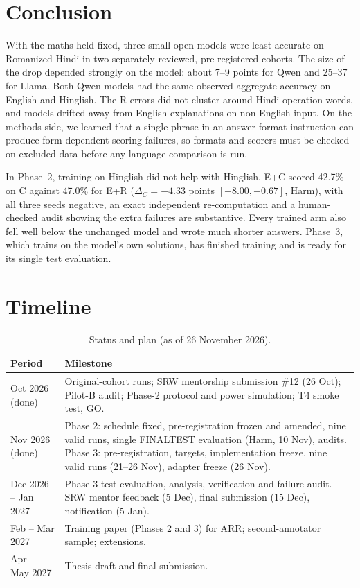 \documentclass[12pt,a4paper,oneside]{report}
\renewcommand{\_}{\oldunderscore\allowbreak}
\begin{document}
\section{Conclusion}

With the maths held fixed, three small open models were least accurate on Romanized Hindi in two separately reviewed, pre-registered cohorts. The size of the drop depended strongly on the model: about 7--9 points for Qwen and 25--37 for Llama. Both Qwen models had the same observed aggregate accuracy on English and Hinglish. The R errors did not cluster around Hindi operation words, and models drifted away from English explanations on non-English input. On the methods side, we learned that a single phrase in an answer-format instruction can produce form-dependent scoring failures, so formats and scorers must be checked on excluded data before any language comparison is run.

In Phase~2, training on Hinglish did not help with Hinglish. E+C scored 42.7\% on C against 47.0\% for E+R ($\Delta_C = -4.33$ points $[-8.00, -0.67]$, Harm), with all three seeds negative, an exact independent re-computation and a human-checked audit showing the extra failures are substantive. Every trained arm also fell well below the unchanged model and wrote much shorter answers. Phase~3, which trains on the model's own solutions, has finished training and is ready for its single test evaluation.

\section{Timeline}

\begin{table}[H]
\centering\small
\caption{Status and plan (as of 26 November 2026).}
\label{tab:timeline}
\begin{tabularx}{\linewidth}{@{}lL@{}}
\toprule
Period & Milestone\\
\midrule
Oct 2026 (done) & Original-cohort runs; SRW mentorship submission \#12 (26 Oct); Pilot-B audit; Phase-2 protocol and power simulation; T4 smoke test, GO.\\
Nov 2026 (done) & Phase 2: schedule fixed, pre-registration frozen and amended, nine valid runs, single FINAL\_TEST evaluation (Harm, 10 Nov), audits. Phase 3: pre-registration, targets, implementation freeze, nine valid runs (21--26 Nov), adapter freeze (26 Nov).\\
Dec 2026 -- Jan 2027 & Phase-3 test evaluation, analysis, verification and failure audit. SRW mentor feedback (5 Dec), final submission (15 Dec), notification (5 Jan).\\
Feb -- Mar 2027 & Training paper (Phases 2 and 3) for ARR; second-annotator sample; extensions.\\
Apr -- May 2027 & Thesis draft and final submission.\\
\bottomrule
\end{tabularx}
\end{table}
\end{document}
